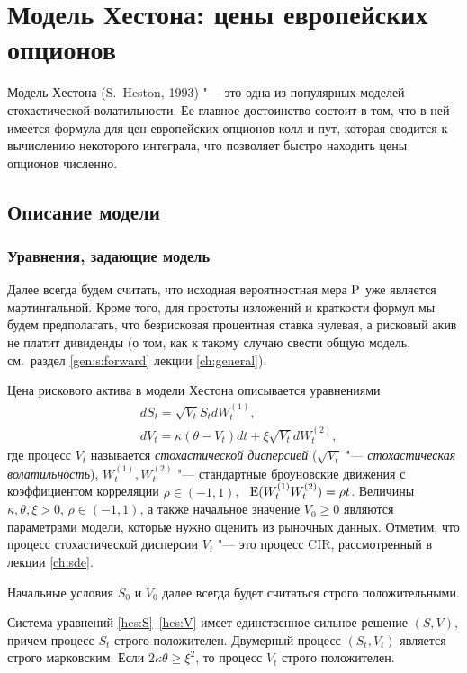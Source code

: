 
\chapter{Модель Хестона: цены европейских опционов}
\label{ch:heston-formula}
\chaptertoc

Модель Хестона (S.~Heston, 1993) "--- это одна из популярных моделей стохастической волатильности.
Ее главное достоинство состоит в том, что в ней имеется формула для цен европейских опционов колл и пут, которая сводится к вычислению некоторого интеграла, что позволяет быстро находить цены опционов численно.

\section{Описание модели}
\subsection{Уравнения, задающие модель}

Далее всегда будем считать, что исходная вероятностная мера $\P$ уже является мартингальной.
Кроме того, для простоты изложений и краткости формул мы будем предполагать, что безрисковая процентная ставка нулевая, а рисковый акив не платит дивиденды (о том, как к такому случаю свести общую модель, см.~раздел \ref{gen:s:forward} лекции \ref{ch:general}).

Цена рискового актива в модели Хестона описывается уравнениями
\begin{align}
\label{hes:S}
&dS_t = \sqrt{V_t}S_t d W_t^{(1)},\\
\label{hes:V}
&d V_t = \kappa(\theta-V_t)dt + \xi\sqrt{V_t} d W_t^{(2)},
\end{align}
где процесс $V_t$ называется \emph{стохастической дисперсией} ($\sqrt{V_t}$ "--- \emph{стохастическая волатильность}), $W_t^{(1)},W_t^{(2)}$ "--- стандартные броуновские движения с коэффициентом корреляции $\rho\in(-1,1)$, \te\ $\E(W_t^{(1)}W_t^{(2)}) = \rho t$.
Величины $\kappa,\theta,\xi>0$, $\rho\in(-1,1)$, а также начальное значение $V_0\ge 0$ являются параметрами модели, которые нужно оценить из рыночных данных.
Отметим, что процесс стохастической дисперсии $V_t$ "--- это процесс CIR, рассмотренный в лекции \ref{ch:sde}.

Начальные условия $S_0$ и $V_0$ далее всегда будет считаться строго положительными.

\begin{proposition}
Система уравнений \eqref{hes:S}--\eqref{hes:V} имеет единственное сильное решение $(S,V)$, причем процесс $S_t$ строго положителен.
Двумерный процесс $(S_t,V_t)$ является строго марковским.
Если $2\kappa\theta\ge \xi^2$, то процесс $V_t$ строго положителен. 
\end{proposition}


